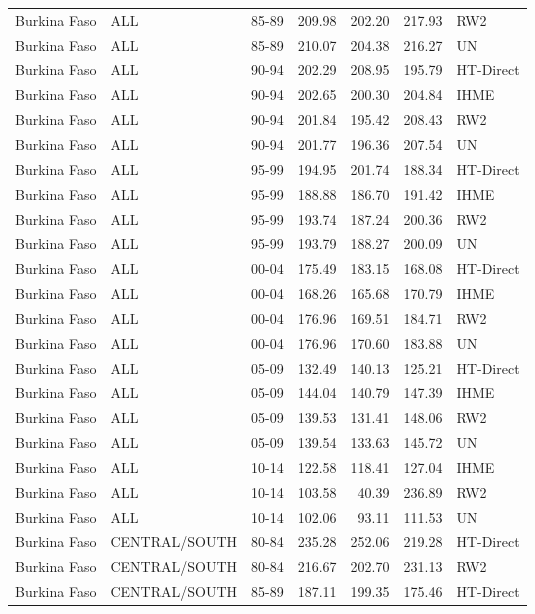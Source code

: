 \begin{longtable}{lllrrrl}
  Burkina Faso & ALL & 85-89 & 209.98 & 202.20 & 217.93 & RW2 \\ 
  Burkina Faso & ALL & 85-89 & 210.07 & 204.38 & 216.27 & UN \\ 
  Burkina Faso & ALL & 90-94 & 202.29 & 208.95 & 195.79 & HT-Direct \\ 
  Burkina Faso & ALL & 90-94 & 202.65 & 200.30 & 204.84 & IHME \\ 
  Burkina Faso & ALL & 90-94 & 201.84 & 195.42 & 208.43 & RW2 \\ 
  Burkina Faso & ALL & 90-94 & 201.77 & 196.36 & 207.54 & UN \\ 
  Burkina Faso & ALL & 95-99 & 194.95 & 201.74 & 188.34 & HT-Direct \\ 
  Burkina Faso & ALL & 95-99 & 188.88 & 186.70 & 191.42 & IHME \\ 
  Burkina Faso & ALL & 95-99 & 193.74 & 187.24 & 200.36 & RW2 \\ 
  Burkina Faso & ALL & 95-99 & 193.79 & 188.27 & 200.09 & UN \\ 
  Burkina Faso & ALL & 00-04 & 175.49 & 183.15 & 168.08 & HT-Direct \\ 
  Burkina Faso & ALL & 00-04 & 168.26 & 165.68 & 170.79 & IHME \\ 
  Burkina Faso & ALL & 00-04 & 176.96 & 169.51 & 184.71 & RW2 \\ 
  Burkina Faso & ALL & 00-04 & 176.96 & 170.60 & 183.88 & UN \\ 
  Burkina Faso & ALL & 05-09 & 132.49 & 140.13 & 125.21 & HT-Direct \\ 
  Burkina Faso & ALL & 05-09 & 144.04 & 140.79 & 147.39 & IHME \\ 
  Burkina Faso & ALL & 05-09 & 139.53 & 131.41 & 148.06 & RW2 \\ 
  Burkina Faso & ALL & 05-09 & 139.54 & 133.63 & 145.72 & UN \\ 
  Burkina Faso & ALL & 10-14 & 122.58 & 118.41 & 127.04 & IHME \\ 
  Burkina Faso & ALL & 10-14 & 103.58 & 40.39 & 236.89 & RW2 \\ 
  Burkina Faso & ALL & 10-14 & 102.06 & 93.11 & 111.53 & UN \\ 
  Burkina Faso & CENTRAL/SOUTH & 80-84 & 235.28 & 252.06 & 219.28 & HT-Direct \\ 
  Burkina Faso & CENTRAL/SOUTH & 80-84 & 216.67 & 202.70 & 231.13 & RW2 \\ 
  Burkina Faso & CENTRAL/SOUTH & 85-89 & 187.11 & 199.35 & 175.46 & HT-Direct \\ 

\end{longtable}
